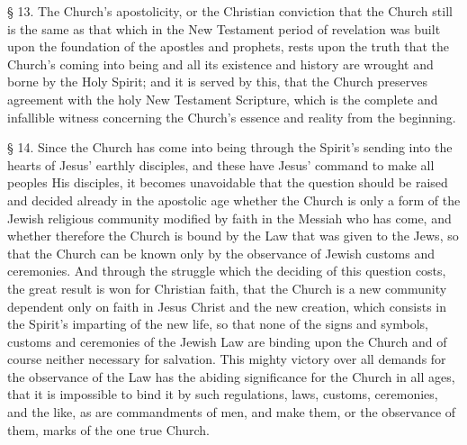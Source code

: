 § 13. The Church’s apostolicity, or the Christian conviction that the Church still is the same as that which in the New Testament period of revelation was built upon the foundation of the apostles and prophets, rests upon the truth that the Church’s coming into being and all its existence and history are wrought and borne by the Holy Spirit; and it is served by this, that the Church preserves agreement with the holy New Testament Scripture, which is the complete and infallible witness concerning the Church’s essence and reality from the beginning.

§ 14. Since the Church has come into being through the Spirit’s sending into the hearts of Jesus’ earthly disciples, and these have Jesus’ command to make all peoples His disciples, it becomes unavoidable that the question should be raised and decided already in the apostolic age whether the Church is only a form of the Jewish religious community modified by faith in the Messiah who has come, and whether therefore the Church is bound by the Law that was given to the Jews, so that the Church can be known only by the observance of Jewish customs and ceremonies. And through the struggle which the deciding of this question costs, the great result is won for Christian faith, that the Church is a new community dependent only on faith in Jesus Christ and the new creation, which consists in the Spirit’s imparting of the new life, so that none of the signs and symbols, customs and ceremonies of the Jewish Law are binding upon the Church and of course neither necessary for salvation. This mighty victory over all demands for the observance of the Law has the abiding significance for the Church in all ages, that it is impossible to bind it by such regulations, laws, customs, ceremonies, and the like, as are commandments of men, and make them, or the observance of them, marks of the one true Church.

